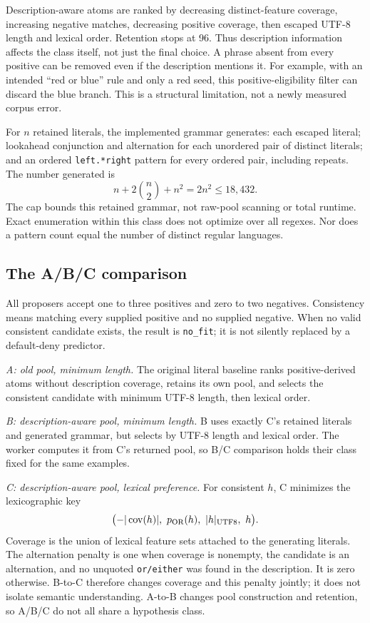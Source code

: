 \documentclass[10pt,twocolumn,letterpaper]{article}
\begin{document}
Description-aware atoms are ranked by decreasing distinct-feature coverage, increasing negative matches, decreasing positive coverage, then escaped UTF-8 length and lexical order. Retention stops at 96. Thus description information affects the class itself, not just the final choice. A phrase absent from every positive can be removed even if the description mentions it. For example, with an intended ``red or blue'' rule and only a red seed, this positive-eligibility filter can discard the blue branch. This is a structural limitation, not a newly measured corpus error.

For $n$ retained literals, the implemented grammar generates: each escaped literal; lookahead conjunction and alternation for each unordered pair of distinct literals; and an ordered \texttt{left.*right} pattern for every ordered pair, including repeats. The number generated is
\begin{equation}
n+2\binom n2+n^2=2n^2\leq18,432.
\end{equation}
The cap bounds this retained grammar, not raw-pool scanning or total runtime. Exact enumeration within this class does not optimize over all regexes. Nor does a pattern count equal the number of distinct regular languages.

\subsection{The A/B/C comparison}
All proposers accept one to three positives and zero to two negatives. Consistency means matching every supplied positive and no supplied negative. When no valid consistent candidate exists, the result is \texttt{no\_fit}; it is not silently replaced by a default-deny predictor.

\emph{A: old pool, minimum length.} The original literal baseline ranks positive-derived atoms without description coverage, retains its own pool, and selects the consistent candidate with minimum UTF-8 length, then lexical order.

\emph{B: description-aware pool, minimum length.} B uses exactly C's retained literals and generated grammar, but selects by UTF-8 length and lexical order. The worker computes it from C's returned pool, so B/C comparison holds their class fixed for the same examples.

\emph{C: description-aware pool, lexical preference.} For consistent $h$, C minimizes the lexicographic key
\begin{equation}
\bigl(-|\operatorname{cov}(h)|,\ p_{\rm OR}(h),\ |h|_{\rm UTF8},\ h\bigr).
\label{eq:selection}
\end{equation}
Coverage is the union of lexical feature sets attached to the generating literals. The alternation penalty is one when coverage is nonempty, the candidate is an alternation, and no unquoted \texttt{or/either} was found in the description. It is zero otherwise. B-to-C therefore changes coverage and this penalty jointly; it does not isolate semantic understanding. A-to-B changes pool construction and retention, so A/B/C do not all share a hypothesis class.
\end{document}
